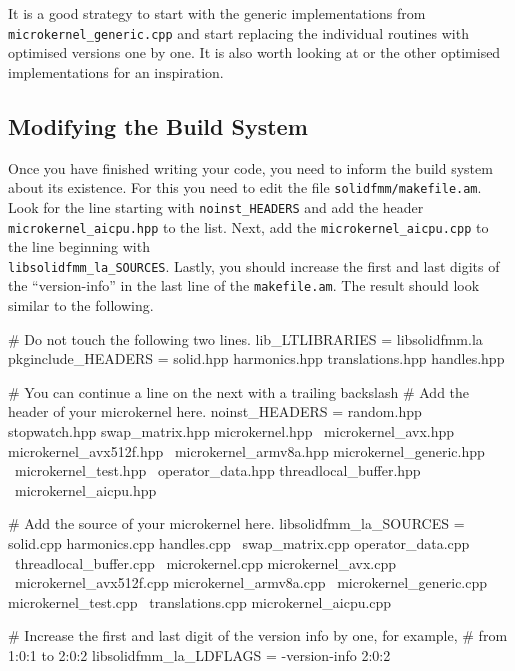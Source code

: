 \documentclass{scrbook}
\begin{document}
It is a good strategy to start with the generic implementations from
\lstinline|microkernel_generic.cpp| and start replacing the individual
routines with optimised versions one by one. It is also worth looking
at or the other optimised implementations for an inspiration.

\subsection{Modifying the Build System}
Once you have finished writing your code, you need to inform the build system
about its existence. For this you need to edit the file
\lstinline|solidfmm/makefile.am|. Look for the line starting with
\lstinline|noinst_HEADERS| and add the header \lstinline|microkernel_aicpu.hpp|
to the list. Next, add the \lstinline|microkernel_aicpu.cpp| to the line
beginning with\\ \lstinline|libsolidfmm_la_SOURCES|. Lastly, you should increase
the first and last digits of the \enquote{version-info} in the last line of the
\lstinline|makefile.am|. The result should look similar to the following.
\begin{commandshell*}
# Do not touch the following two lines.
lib_LTLIBRARIES = libsolidfmm.la
pkginclude_HEADERS = solid.hpp harmonics.hpp translations.hpp handles.hpp


# You can continue a line on the next with a trailing backslash
# Add the header of your microkernel here.
noinst_HEADERS = random.hpp stopwatch.hpp swap_matrix.hpp microkernel.hpp \
                 microkernel_avx.hpp microkernel_avx512f.hpp              \
                 microkernel_armv8a.hpp microkernel_generic.hpp           \
                 microkernel_test.hpp                                     \
                 operator_data.hpp threadlocal_buffer.hpp                 \
                 microkernel_aicpu.hpp

# Add the source of your microkernel here.
libsolidfmm_la_SOURCES = solid.cpp harmonics.cpp handles.cpp             \
                         swap_matrix.cpp operator_data.cpp               \
                         threadlocal_buffer.cpp                          \
                         microkernel.cpp microkernel_avx.cpp             \
                         microkernel_avx512f.cpp microkernel_armv8a.cpp  \
                         microkernel_generic.cpp microkernel_test.cpp    \
                         translations.cpp microkernel_aicpu.cpp
                      
# Increase the first and last digit of the version info by one, for example,
# from 1:0:1 to 2:0:2
libsolidfmm_la_LDFLAGS = -version-info 2:0:2
\end{commandshell*}
\end{document}
